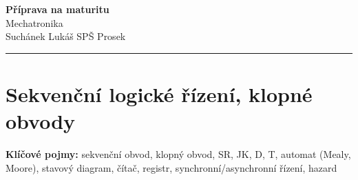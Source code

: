 \documentclass[a4paper,10pt]{article}
\begin{document}
\begin{minipage}[t]{0.75\textwidth}
    {\Huge\bfseries\color{accent} Příprava na maturitu}\\[4pt]
    {\large\color{stripeblue} Mechatronika}\\[2pt]
    \textcolor{medgray}{\small Suchánek Lukáš \quad SPŠ Prosek }
\end{minipage}
\hfill
\begin{minipage}[t]{0.22\textwidth}
    \raggedleft
\end{minipage}

\vspace{6pt}
\noindent\color{accent}\rule{\linewidth}{1.5pt}
\vspace{2pt}

\section{Sekvenční logické řízení, klopné obvody}

\begin{pojmybox}
\textbf{Klíčové pojmy:}
sekvenční obvod, klopný obvod, SR, JK, D, T,
automat (Mealy, Moore), stavový diagram, čítač, registr,
synchronní/asynchronní řízení, hazard
\end{pojmybox}
\end{document}
